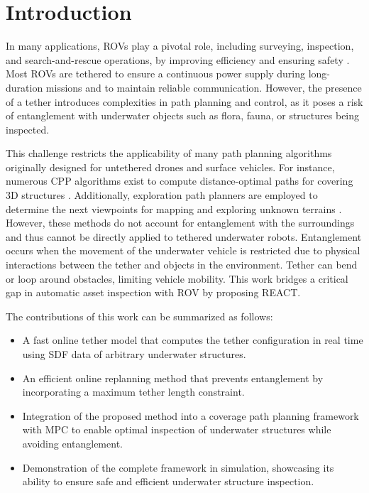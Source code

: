 \section{Introduction}
\label{sec:introduction}

%
In many applications, \Acfp{ROV} play a pivotal role, including surveying, inspection, and search-and-rescue operations, by improving efficiency and ensuring safety \cite{amer2023unav, amergp}.
%
%
Most \acp{ROV} are tethered to ensure a continuous power supply during long-duration missions and to maintain reliable communication.
%
%
However, the presence of a tether introduces complexities in path planning and control, as it poses a risk of entanglement with underwater objects such as flora, fauna, or structures being inspected.

This challenge restricts the applicability of many path planning algorithms originally designed for untethered drones and surface vehicles. For instance, numerous \ac{CPP} algorithms exist to compute distance-optimal paths for covering 3D structures \cite{bircher2015structural,feng2024fc, amer2023visual}. Additionally, exploration path planners are employed to determine the next viewpoints for mapping and exploring unknown terrains \cite{dang2020graph}. However, these methods do not account for entanglement with the surroundings and thus cannot be directly applied to tethered underwater robots.
%
%
Entanglement occurs when the movement of the underwater vehicle is restricted due to physical interactions between the tether and objects in the environment. Tether can bend or loop around obstacles, limiting vehicle mobility. This work bridges a critical gap in automatic asset inspection with \ac{ROV} by proposing \ac{REACT}.

The contributions of this work can be summarized as follows:
\begin{itemize}
\item A fast online tether model that computes the tether configuration in real time using \ac{SDF} data of arbitrary underwater structures.
\item An efficient online replanning method that prevents entanglement by incorporating a maximum tether length constraint.
\item Integration of the proposed method into a coverage path planning framework with \ac{MPC} to enable optimal inspection of underwater structures while avoiding entanglement.

\item Demonstration of the complete framework in simulation, showcasing its ability to ensure safe and efficient underwater structure inspection.
\end{itemize}





